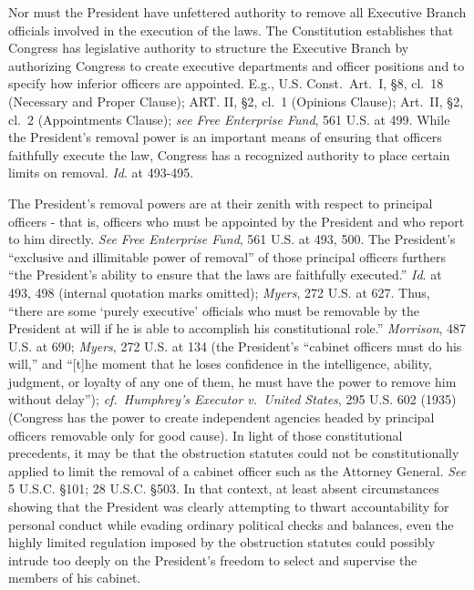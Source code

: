 Nor must the President have unfettered authority to remove all Executive Branch officials involved in the execution of the laws.
The Constitution establishes that Congress has legislative authority to structure the Executive Branch by authorizing Congress to create executive departments and officer positions and to specify how inferior officers are appointed.
E.g., U.S. Const.\ Art.~I, \S 8, cl.~18 (Necessary and Proper Clause); ART. II, \S 2, cl.~1 (Opinions Clause); Art.~II, \S 2, cl.~2 (Appointments Clause);
\textit{see Free Enterprise Fund}, 561 U.S. at 499. While the President’s removal power is an important means of ensuring that officers faithfully execute the law, Congress has a recognized authority to place certain limits on removal.
\textit{Id}. at 493-495.

The President’s removal powers are at their zenith with respect to principal officers - that is, officers who must be appointed by the President and who report to him directly.
\textit{See Free Enterprise Fund}, 561 U.S. at 493, 500.
The President’s “exclusive and illimitable power of removal” of those principal officers furthers “the President’s ability to ensure that the laws are faithfully executed.”
\textit{Id}. at 493, 498 (internal quotation marks omitted);
\textit{Myers}, 272 U.S. at 627.
Thus, “there are some ‘purely executive’ officials who must be removable by the President at will if he is able to accomplish his constitutional role.”
\textit{Morrison}, 487 U.S. at 690;
\textit{Myers}, 272 U.S. at 134 (the President’s “cabinet officers must do his will,” and “[t]he moment that he loses confidence in the intelligence, ability, judgment, or loyalty of any one of them, he must have the power to remove him without delay”);
\textit{cf.~Humphrey’s Executor v.\ United States}, 295 U.S. 602 (1935) (Congress has the power to create independent agencies headed by principal officers removable only for good cause).
In light of those constitutional precedents, it may be that the obstruction statutes could not be constitutionally applied to limit the removal of a cabinet officer such as the Attorney General.
\textit{See} 5 U.S.C. \S 101; 28 U.S.C. \S 503.
In that context, at least absent circumstances showing that the President was clearly attempting to thwart accountability for personal conduct while evading ordinary political checks and balances, even the highly limited regulation imposed by the obstruction statutes could possibly intrude too deeply on the President’s freedom to select and supervise the members of his cabinet.

